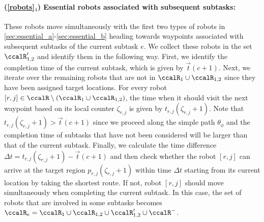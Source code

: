 \documentclass[Afour,sageh,times]{sagej}
\begin{document}
{{ \paragraph{(\ref*{robots}$_4$) Essential robots associated with subsequent subtasks:} These robots move simultaneously with the first two types of robots in \ref{sec:essential_a}-\ref{sec:essential_b} heading towards  waypoints associated with subsequent subtasks of the current subtask $e$. We collect these robots in the set $\ccalR'_{1,2}$ and identify them in the following way. First, we identify the completion time  of the current subtask, which is given by $\vec{t}(c+1)$.  Next, we iterate over the remaining robots that are not in $\ccalR_1 \cup \ccalR_{1,2}$ since they have been assigned target locations. For every robot $[r,j] \in \ccalR \setminus(\ccalR_1 \cup \ccalR_{1,2})$, the time when it should visit the next waypoint based on its local counter $\zeta_{r,j}$ is given by $t_{r,j}(\zeta_{r,j}+1)$. Note that {$t_{r, j}(\zeta_{r,j}+1) > \vec{t}(c+1)$} since we proceed along the simple path $\theta_{\phi}$ and the completion time of  subtasks that have not been considered %
 will be larger than that of the current subtask. Finally, we calculate the time difference $\Delta t = t_{r, j}(\zeta_{r,j}+1) - \vec{t}(c+1)$  and then check whether the robot $[r, j]$ can arrive at the target region $p_{r,j}(\zeta_{r,j}+1)$  within time $\Delta t$ starting from  its current location by taking the shortest route. {If not, robot $[r, j]$ should move simultaneously when completing the current subtask.} In this case, the set of robots that are involved in some subtasks becomes $\ccalR_e = \ccalR_1 \cup \ccalR_{1,2} \cup \ccalR'_{1,2}\cup \ccalR^-$.

}}
\end{document}
